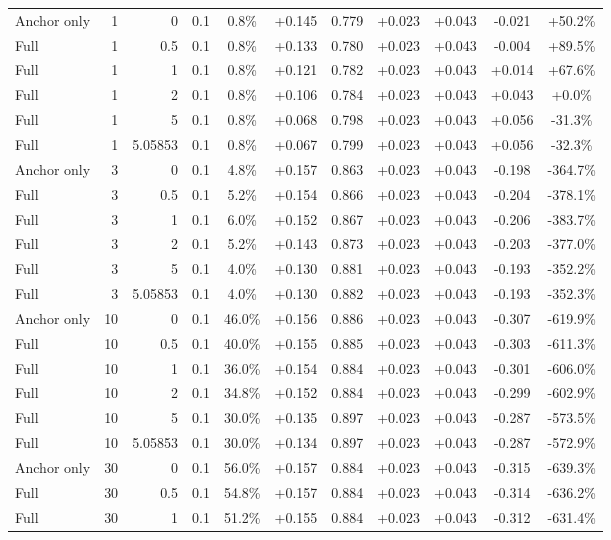 \begin{table}[htbp]
\begin{tabular}{lrrrccccccc}
Anchor only & 1 & 0 & 0.1 & 0.8\% & +0.145 & 0.779 & +0.023 & +0.043 & -0.021 & +50.2\% \\
Full & 1 & 0.5 & 0.1 & 0.8\% & +0.133 & 0.780 & +0.023 & +0.043 & -0.004 & +89.5\% \\
Full & 1 & 1 & 0.1 & 0.8\% & +0.121 & 0.782 & +0.023 & +0.043 & +0.014 & +67.6\% \\
Full & 1 & 2 & 0.1 & 0.8\% & +0.106 & 0.784 & +0.023 & +0.043 & +0.043 & +0.0\% \\
Full & 1 & 5 & 0.1 & 0.8\% & +0.068 & 0.798 & +0.023 & +0.043 & +0.056 & -31.3\% \\
Full & 1 & 5.05853 & 0.1 & 0.8\% & +0.067 & 0.799 & +0.023 & +0.043 & +0.056 & -32.3\% \\
Anchor only & 3 & 0 & 0.1 & 4.8\% & +0.157 & 0.863 & +0.023 & +0.043 & -0.198 & -364.7\% \\
Full & 3 & 0.5 & 0.1 & 5.2\% & +0.154 & 0.866 & +0.023 & +0.043 & -0.204 & -378.1\% \\
Full & 3 & 1 & 0.1 & 6.0\% & +0.152 & 0.867 & +0.023 & +0.043 & -0.206 & -383.7\% \\
Full & 3 & 2 & 0.1 & 5.2\% & +0.143 & 0.873 & +0.023 & +0.043 & -0.203 & -377.0\% \\
Full & 3 & 5 & 0.1 & 4.0\% & +0.130 & 0.881 & +0.023 & +0.043 & -0.193 & -352.2\% \\
Full & 3 & 5.05853 & 0.1 & 4.0\% & +0.130 & 0.882 & +0.023 & +0.043 & -0.193 & -352.3\% \\
Anchor only & 10 & 0 & 0.1 & 46.0\% & +0.156 & 0.886 & +0.023 & +0.043 & -0.307 & -619.9\% \\
Full & 10 & 0.5 & 0.1 & 40.0\% & +0.155 & 0.885 & +0.023 & +0.043 & -0.303 & -611.3\% \\
Full & 10 & 1 & 0.1 & 36.0\% & +0.154 & 0.884 & +0.023 & +0.043 & -0.301 & -606.0\% \\
Full & 10 & 2 & 0.1 & 34.8\% & +0.152 & 0.884 & +0.023 & +0.043 & -0.299 & -602.9\% \\
Full & 10 & 5 & 0.1 & 30.0\% & +0.135 & 0.897 & +0.023 & +0.043 & -0.287 & -573.5\% \\
Full & 10 & 5.05853 & 0.1 & 30.0\% & +0.134 & 0.897 & +0.023 & +0.043 & -0.287 & -572.9\% \\
Anchor only & 30 & 0 & 0.1 & 56.0\% & +0.157 & 0.884 & +0.023 & +0.043 & -0.315 & -639.3\% \\
Full & 30 & 0.5 & 0.1 & 54.8\% & +0.157 & 0.884 & +0.023 & +0.043 & -0.314 & -636.2\% \\
Full & 30 & 1 & 0.1 & 51.2\% & +0.155 & 0.884 & +0.023 & +0.043 & -0.312 & -631.4\% \\

\end{tabular}
\end{table}
